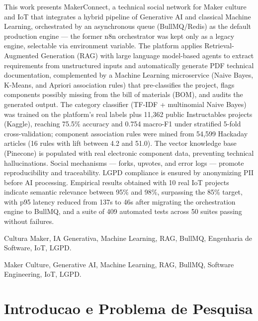 \documentclass[portuguese]{sbcreviews-2025}%
\begin{document}
\begin{frontmatter}
\begin{abstract-en}
This work presents MakerConnect, a technical social network for Maker culture and IoT that integrates a hybrid pipeline of Generative AI and classical Machine Learning, orchestrated by an asynchronous queue (BullMQ/Redis) as the default production engine --- the former n8n orchestrator was kept only as a legacy engine, selectable via environment variable. The platform applies Retrieval-Augmented Generation (RAG) with large language model-based agents to extract requirements from unstructured inputs and automatically generate PDF technical documentation, complemented by a Machine Learning microservice (Naive Bayes, K-Means, and Apriori association rules) that pre-classifies the project, flags components possibly missing from the bill of materials (BOM), and audits the generated output. The category classifier (TF-IDF + multinomial Naive Bayes) was trained on the platform's real labels plus 11,362 public Instructables projects (Kaggle), reaching 75.5\% accuracy and 0.754 macro-F1 under stratified 5-fold cross-validation; component association rules were mined from 54,599 Hackaday articles (16 rules with lift between 4.2 and 51.0). The vector knowledge base (Pinecone) is populated with real electronic component data, preventing technical hallucinations. Social mechanisms --- forks, upvotes, and error logs --- promote reproducibility and traceability. LGPD compliance is ensured by anonymizing PII before AI processing. Empirical results obtained with 10 real IoT projects indicate semantic relevance between 95\% and 98\%, surpassing the 85\% target, with p95 latency reduced from 137s to 46s after migrating the orchestration engine to BullMQ, and a suite of 409 automated tests across 50 suites passing without failures.
\end{abstract-en}

\begin{pchaves}
Cultura Maker, IA Generativa, Machine Learning, RAG, BullMQ, Engenharia de Software, IoT, LGPD.
\end{pchaves}

\begin{keywords}
Maker Culture, Generative AI, Machine Learning, RAG, BullMQ, Software Engineering, IoT, LGPD.
\end{keywords}

\end{frontmatter}

\section{Introducao e Problema de Pesquisa}
\end{document}
